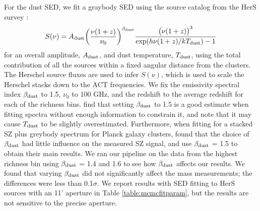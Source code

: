 \documentclass[a4paper,fleqn,usenatbib]{mnras}
\begin{document}
For the dust SED, we fit a graybody SED using the source catalog from the HerS survey \citep{2014ApJS..210...22V}:
\begin{equation}
  \label{eq:dustSED}
  \centering
  S(\nu) = A_{\rm dust}  \bigg(\frac{\nu(1+z)}{\nu_0}\bigg)^{\beta_{\rm dust}} \frac{\big(\nu(1+z)\big)^{3} }{{\exp({h \nu (1+z) / k T_{\rm dust}}) - 1}}
\end{equation}
for an overall amplitude, $A_{\rm dust}$, and dust temperature, $T_{\rm dust}$, using the total contribution of all the sources within a fixed angular distance from the clusters. 
The Herschel source fluxes are used to infer $S(\nu)$, which is used to scale the Herschel stacks down to the ACT frequencies. 
We fix the emissivity spectral index $\beta_{\rm dust}$ to 1.5, $\nu_0$ to 100 GHz, and the redshift to the average redshift for each of the richness bins. 
\cite{2014A&A...561A..86M} find that setting $\beta_{\rm dust}$ to 1.5 is a good estimate when fitting spectra without enough information to constrain it, and note that it may cause $T_{\rm dust}$ to be slightly overestimated. 
Furthermore, when fitting for a stacked SZ plus greybody spectrum for Planck galaxy clusters, \cite{2018MNRAS.476.3360E} found that the choice of $\beta_{\rm dust}$ had little influence on the measured SZ signal, and use $\beta_{\rm dust}$ = 1.5 to obtain their main results. 
We ran our pipeline on the data from the highest richness bin using $\beta_{\rm dust}$ = 1.4 and 1.6 to see how $\beta_{\rm dust}$ affects our results. We found that varying $\beta_{\rm dust}$ did not significantly affect the mass measurements; the differences were less than 0.1$\sigma$. 
We report results with SED fitting to HerS sources with an 11' aperture in Table \ref{table:mcmcfitparam}, but the results are not sensitive to the precise aperture.
\end{document}
